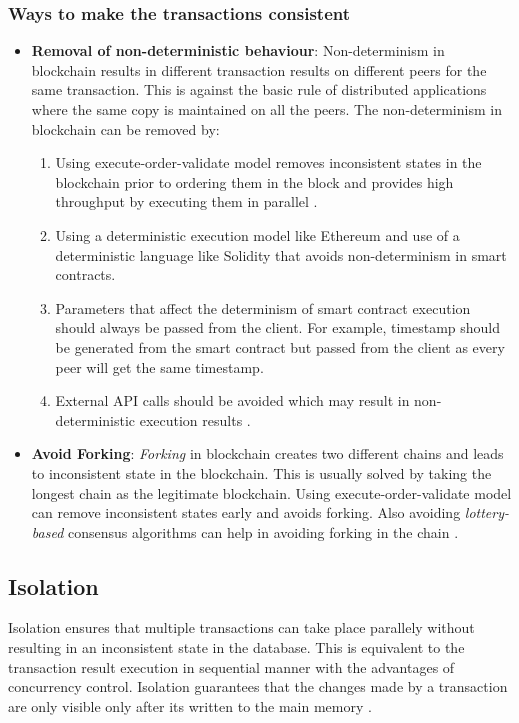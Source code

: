 \documentclass[
  a4paper,  %
  twoside,  %
  bibliography=totoc,
  headsepline,
  cleardoublepage=empty,
  parskip=half,
  draft=false
]{scrbook}
\begin{document}
\subsubsection{Ways to make the transactions consistent}
\begin{itemize}
    \item \textbf{Removal of non-deterministic behaviour}: Non-determinism in blockchain results in different transaction results on different peers for the same transaction. This is against the basic rule of distributed applications where the same copy is maintained on all the peers. The non-determinism in blockchain can be removed by:
    \begin{enumerate}
        \item Using execute-order-validate model removes inconsistent states in the blockchain prior to ordering them in the block and provides high throughput by executing them in parallel \cite{HF}.
        \item Using a deterministic execution model like Ethereum \cite{evm} and use of a deterministic language like Solidity \cite{sol} that avoids non-determinism in smart contracts.
        \item Parameters that affect the determinism of smart contract execution should always be passed from the client. For example, timestamp should be generated from the smart contract but passed from the client as every peer will get the same timestamp.
        \item External API calls should be avoided which may result in non-deterministic execution results \cite{HW2}.
    \end{enumerate}
    \item \textbf{Avoid Forking}: \textit{Forking} in blockchain creates two different chains and leads to inconsistent state in the blockchain. This is usually solved by taking the longest chain as the legitimate blockchain. Using execute-order-validate model can remove inconsistent states early and avoids forking. Also avoiding \textit{lottery-based} consensus algorithms can help in avoiding forking in the chain \cite{HW1}.
\end{itemize}

\subsection{Isolation}
Isolation ensures that multiple transactions can take place parallely without resulting in an inconsistent state in the database. This is equivalent to the transaction result execution in sequential manner with the advantages of concurrency control. Isolation guarantees that the changes made by a transaction are only visible only after its written to the main memory \cite{Atomicity}.
\end{document}
